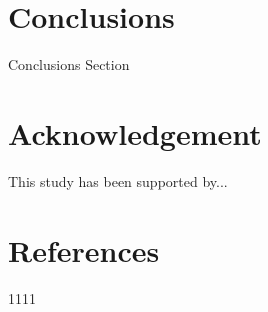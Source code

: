 \documentclass[review, 1p, number, sort&compress,table]{elsarticle}
\begin{document}
	      

	\section{Conclusions}
	\indent Conclusions Section

	\section{Acknowledgement}
	\indent This study has been supported by...      			
	
\section{References}
		
1111
\end{document}
